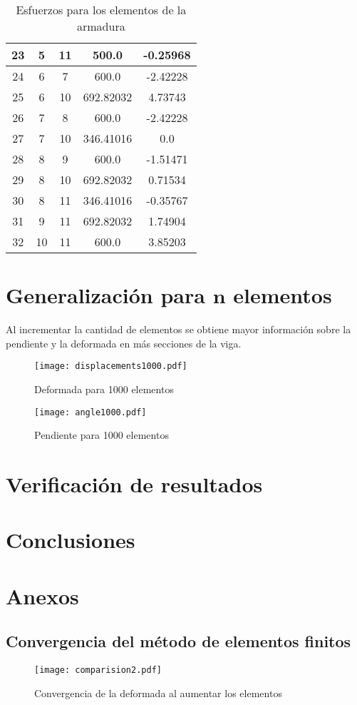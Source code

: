 \documentclass[12pt,a4paper]{article}
\begin{document}
\begin{table}[H]
{\begin{tabular}{c||c|c||c||c}
        \hline
        23 & 5 & 11 & 500.0 & -0.25968 \\
        \hline
        24 & 6 & 7 & 600.0 & -2.42228 \\
        \hline
        25 & 6 & 10 & 692.82032 & 4.73743 \\
        \hline
        26 & 7 & 8 & 600.0 & -2.42228 \\
        \hline
        27 & 7 & 10 & 346.41016 & 0.0 \\
        \hline
        28 & 8 & 9 & 600.0 & -1.51471 \\
        \hline
        29 & 8 & 10 & 692.82032 & 0.71534 \\
        \hline
        30 & 8 & 11 & 346.41016 & -0.35767 \\
        \hline
        31 & 9 & 11 & 692.82032 & 1.74904 \\
        \hline
        32 & 10 & 11 & 600.0 & 3.85203
    \end{tabular}}
    \caption{Esfuerzos para los elementos de la armadura}
\end{table}
\section{Generalización para $\mathbf{n}$ elementos}
Al incrementar la cantidad de elementos se obtiene mayor información sobre la pendiente y la deformada en más secciones de la viga.
\begin{figure}[H]
    \centering
    \texttt{[image: displacements1000.pdf]}
    \caption{Deformada para 1000 elementos}
\end{figure}
\begin{figure}[H]
    \centering
    \texttt{[image: angle1000.pdf]}
    \caption{Pendiente para 1000 elementos}
\end{figure}

\section{Verificación de resultados}

\section{Conclusiones}

\section*{Anexos}
\subsection*{Convergencia del método de elementos finitos}
\begin{figure}[H]
    \centering
    \texttt{[image: comparision2.pdf]}
    \caption{Convergencia de la deformada al aumentar los elementos}
\end{figure}
\end{document}
